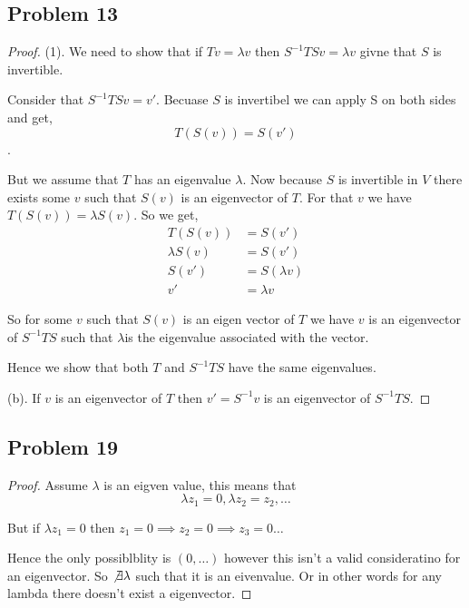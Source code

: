 \documentclass[a4paper]{report}
\begin{document}
\subsection*{Problem 13}
\begin{proof}
   (1). We need to show that if $T v = \lambda v$ then $S^{-1}TS v = \lambda v$ givne that $S$ is invertible.

   Consider that $S^{-1}TS v = v'$. Becuase $S$ is invertibel we can apply S on both sides and get, 
   $$ T(S(v)) = S(v') $$ .

   But we  assume that $T$ has an eigenvalue $\lambda$. Now because  $S$ is invertible in $V$ there exists some $v$ such that $S(v)$ is an eigenvector  of $T$. For that  $v$ we have $T(S(v)) = \lambda S(v)$. So we get, 
   \begin{align*}
      T(S(v)) &= S(v') \\
      \lambda S(v) &= S(v') \\
      S(v') &= S(\lambda v)\\
      v' &= \lambda v
   \end{align*} 

   So for some  $v$ such that $S(v)$ is an eigen vector of $T$ we have $v$ is an eigenvector of $S^{-1}TS$ such that $\lambda$is the eigenvalue associated with the vector.

   Hence we show that both $T$ and $S^{-1}TS$ have the same eigenvalues.

   (b). If $v$ is an eigenvector of $T$ then $v' = S^{-1}v$ is an eigenvector of $S^{-1}TS$.
\end{proof}





\subsection*{Problem 19}
\begin{proof}
   
Assume $\lambda$ is an eigven value, this means that 
$$ \lambda z_1 = 0, \lambda z_2 = z_2,\dots$$

But if $\lambda z_1 = 0 $ then $z_1 = 0\implies z_2 = 0 \implies z_3 = 0 \dots$ 

Hence the only possiblblity is $(0,\dots)$ however this isn't a valid consideratino for an eigenvector. So  $\not \exists \lambda $ such that it is an eivenvalue. Or in other words for any lambda there doesn't exist a eigenvector.

\end{proof}
\end{document}
